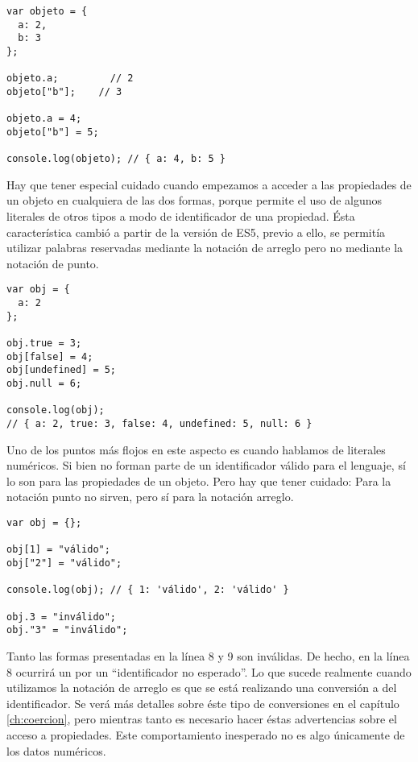 \begin{lstlisting}[title={Notación punto y notación arreglo}]
var objeto = {
  a: 2,
  b: 3
};

objeto.a;		  // 2
objeto["b"];	// 3

objeto.a = 4;
objeto["b"] = 5;

console.log(objeto); //​​​​​ { a: 4, b: 5 }
\end{lstlisting}

Hay que tener especial cuidado cuando empezamos a acceder a las propiedades de un objeto en cualquiera de las dos formas, porque permite el uso de algunos literales de otros tipos a modo de identificador de una propiedad. Ésta característica cambió a partir de la versión de ES5, previo a ello, se permitía utilizar palabras reservadas mediante la notación de arreglo pero no mediante la notación de punto.

\begin{lstlisting}[title={Utilizando literales como claves}]
var obj = {
  a: 2
};

obj.true = 3;
obj[false] = 4;
obj[undefined] = 5;
obj.null = 6;

console.log(obj);
// { a: 2, true: 3, false: 4, undefined: 5, null: 6 }​​​​​
\end{lstlisting}

Uno de los puntos más flojos en este aspecto es cuando hablamos de literales numéricos. Si bien no forman parte de un identificador válido para el lenguaje, sí lo son para las propiedades de un objeto. Pero hay que tener cuidado: Para la notación punto no sirven, pero sí para la notación arreglo.

\begin{lstlisting}[title={Utilizando números como claves}]
var obj = {};

obj[1] = "válido";
obj["2"] = "válido";

console.log(obj); // ​​​​​{ 1: 'válido', 2: 'válido' }​​​​​

obj.3 = "inválido";
obj."3" = "inválido";
\end{lstlisting}

Tanto las formas presentadas en la línea 8 y 9 son inválidas. De hecho, en la línea 8 ocurrirá un  por un "`identificador no esperado"'. Lo que sucede realmente cuando utilizamos la notación de arreglo es que se está realizando una conversión a  del identificador. Se verá más detalles sobre éste tipo de conversiones en el capítulo \ref{ch:coercion}, pero mientras tanto es necesario hacer éstas advertencias sobre el acceso a propiedades. Este comportamiento inesperado no es algo únicamente de los datos numéricos.


